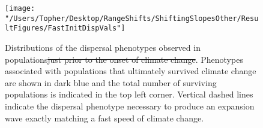 \documentclass[11pt]{article}
\providecommand{\DIFaddtex}[1]{{\protect\color{blue}\uwave{#1}}} %
\providecommand{\DIFdeltex}[1]{{\protect\color{red}\sout{#1}}}                      %
\providecommand{\DIFaddFL}[1]{\DIFadd{#1}} %
\providecommand{\DIFdelFL}[1]{\DIFdel{#1}} %
\providecommand{\DIFaddbeginFL}{} %
\providecommand{\DIFaddendFL}{} %
\providecommand{\DIFdelbeginFL}{} %
\providecommand{\DIFdelendFL}{} %
\providecommand{\DIFadd}[1]{\texorpdfstring{\DIFaddtex{#1}}{#1}} %
\providecommand{\DIFdel}[1]{\texorpdfstring{\DIFdeltex{#1}}{}} %
\begin{document}
\clearpage

\begin{figure}[h!]
\texttt{[image: "/Users/Topher/Desktop/RangeShifts/ShiftingSlopesOther/ResultFigures/FastInitDispVals"]}
\caption{Distributions of the dispersal phenotypes observed in \DIFaddbeginFL \DIFaddFL{equilibrium }\DIFaddendFL populations\DIFdelbeginFL \DIFdelFL{just prior to the onset of climate change}\DIFdelendFL . Phenotypes associated with populations that ultimately survived climate change are shown in dark blue and the total number of surviving populations is indicated in the top left corner. Vertical dashed lines indicate the dispersal phenotype necessary to produce an expansion wave exactly matching a fast speed of climate change.}
\label{Fig:InitDispFast}
\end{figure}
\end{document}
